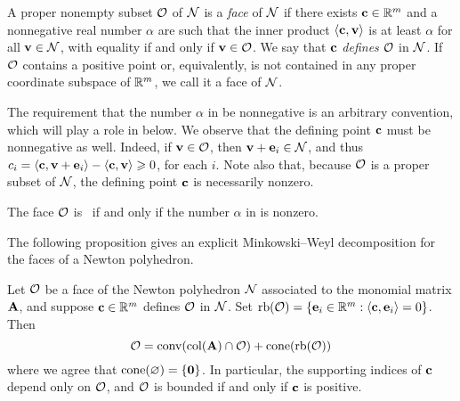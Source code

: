 \documentclass{article}
\begin{document}
\begin{definition}[Face]
   \label{defn: face}
   A proper nonempty subset $\mathcal{O}$ of $\mathcal{N}$ is a \emph{face} of $\mathcal{N}$ if there exists $\mathbf{c} \in \mathbb{R}^m$ and a nonnegative real number $\alpha$ are such that the inner product $\langle \mathbf{c}, \mathbf{v} \rangle$ is at least $\alpha$ for all $\mathbf{v} \in \mathcal{N}$, with equality if and only if $\mathbf{v} \in \mathcal{O}$.
   We say that $\mathbf{c}$ \emph{defines} $\mathcal{O}$ in $\mathcal{N}$.
   If $\mathcal{O}$ contains a positive point or, equivalently, is not contained in any proper coordinate subspace of $\mathbb{R}^m$, we call it a \emph{\positive} face of $\mathcal{N}$.
\end{definition}

\begin{remark}
   \label{rmk: nonnegativity of defining point}
   The requirement that the number $\alpha$ in  be nonnegative is an arbitrary convention, which will play a role in  below.
   We observe that the defining point $\mathbf{c}$ must be nonnegative as well.
   Indeed, if $\mathbf{v} \in \mathcal{O}$, then $\mathbf{v} + \mathbf{e}_i \in \mathcal{N}$, and thus $c_i = \langle \mathbf{c}, \mathbf{v} + \mathbf{e}_i \rangle - \langle \mathbf{c}, \mathbf{v} \rangle \geqslant 0$, for each $i$.
   Note also that, because $\mathcal{O}$ is a proper subset of $\mathcal{N}$, the defining point $\mathbf{c}$ is necessarily nonzero.
\end{remark}

\begin{remark}
   \label{rmk: standard faces}
   The face $\mathcal{O}$ is \positive\ if and only if the number $\alpha$ in  is nonzero.
\end{remark}

The following proposition gives an explicit Minkowski--Weyl decomposition for the faces of a Newton polyhedron.

\begin{proposition}
   \label{prop: MW for faces}
   Let $\mathcal{O}$ be a face of the Newton polyhedron $\mathcal{N}$ associated to the monomial matrix $\mathbf{A}$, and suppose $\mathbf{c} \in \mathbb{R}^m$ defines $\mathcal{O}$ in $\mathcal{N}$.
   Set $\operatorname{rb}(\mathcal{O}) =  \{ \mathbf{e}_i \in \mathbb{R}^m : \langle \mathbf{c}, \mathbf{e}_i \rangle = 0\}$.
   Then
   \[\mathcal{O} =  \operatorname{conv}( \operatorname{col}(\mathbf{A}) \cap \mathcal{O} ) + \operatorname{cone}(\operatorname{rb}(\mathcal{O}))\]
   where we agree that $\operatorname{cone}(\varnothing) = \{\mathbf{0}\}$.
   In particular, the supporting indices of $\mathbf{c}$ depend only on $\mathcal{O}$, and $\mathcal{O}$ is bounded if and only if $\mathbf{c}$ is positive.
\end{proposition}
\end{document}
